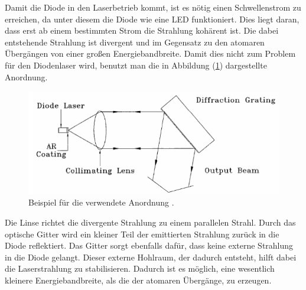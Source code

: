 \noindent Damit die Diode in den Laserbetrieb kommt, ist es nötig einen Schwellenstrom zu erreichen, da unter diesem die Diode wie eine LED funktioniert. Dies liegt daran, dass erst ab einem bestimmten
Strom die Strahlung kohärent ist. Die dabei entstehende Strahlung ist divergent und im Gegensatz zu den atomaren Übergängen von einer großen Energiebandbreite. Damit dies nicht zum Problem
für den Diodenlaser wird, benutzt man die in Abbildung (\ref{fig:litt}) dargestellte Anordnung.
\begin{figure}[h!]
  \centering
  \includegraphics[scale=0.7]{fig/litt.png}
  \caption{Beispiel für die verwendete Anordnung \cite[5]{Anleitung}.}
  \label{fig:litt}
\end{figure}
\FloatBarrier
\noindent Die Linse richtet die divergente Strahlung zu einem parallelen Strahl. Durch das optische Gitter wird ein kleiner Teil der emittierten Strahlung zurück in die Diode reflektiert. Das Gitter sorgt ebenfalls dafür, dass keine externe Strahlung in die Diode gelangt. Dieser externe Hohlraum, der dadurch entsteht, hilft dabei die Laserstrahlung zu stabilisieren. Dadurch ist es möglich, eine wesentlich kleinere Energiebandbreite, als die der atomaren Übergänge, zu erzeugen.
